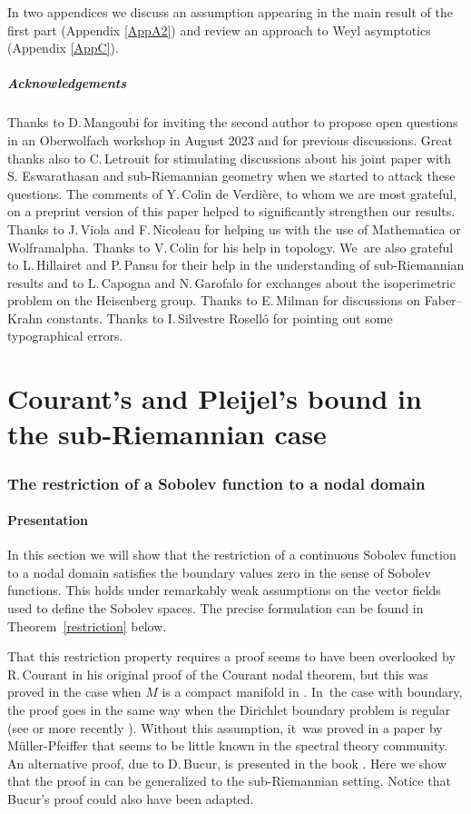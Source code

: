 \documentclass[10pt]{amsart}
\theoremstyle{definition}
\newcommand{\1}{\mathbbm{1}}
\begin{document}
In two appendices we discuss an assumption appearing in the main result of the first part (Appendix \ref{AppA2}) and review an approach to Weyl asymptotics (Appendix \ref{AppC}).

\subsubsection*{Acknowledgements}
Thanks to D.\,Mangoubi for inviting the second author to propose open questions in an Oberwolfach workshop in August 2023 and for previous discussions. Great thanks also to C.\,Letrouit for stimulating discussions about his joint paper with S. Eswarathasan and sub-Riemannian geometry when we started to attack these questions. The comments of Y.\,Colin de Verdière, to whom we are most grateful, on a preprint version \cite{FrHe1} of this paper helped to significantly strengthen our results. Thanks to J.\,Viola and F.\,Nicoleau for helping us with the use of Mathematica or Wolframalpha. Thanks to V.\,Colin for his help in topology. We~are also grateful to L.\,Hillairet and P.\,Pansu for their help in the understanding of sub-Riemannian results and to L.\,Capogna and N.\,Garofalo for exchanges about the isoperimetric problem on the Heisenberg group. Thanks to E.\,Milman for discussions on Faber--Krahn constants. Thanks to I.\,Silvestre Roselló for pointing out some typographical errors.

\part{Courant's and Pleijel's bound in the sub-Riemannian case}

\section{The restriction of a Sobolev function to a nodal domain}\label{srest}

\subsection{Presentation}
In this section we will show that the restriction of a continuous Sobolev function to a nodal domain satisfies the boundary values zero in the sense of Sobolev functions. This holds under remarkably weak assumptions on the vector fields used to define the Sobolev spaces. The precise formulation can be found in Theorem~\ref{restriction} below.

That this restriction property requires a proof seems to have been overlooked by R.\,Courant in his original proof of the Courant nodal theorem, but this was proved in the case when $M$ is a compact manifold in \cite{BerMe}. In~the case with boundary, the proof goes in the same way when the Dirichlet boundary problem is regular (see \cite{An} or more recently \cite{LMP}). Without this assumption, it~was proved in a paper by Müller-Pfeiffer \cite{MP} that seems to be little known in the spectral theory community. An alternative proof, due to D.\,Bucur, is presented in the book \cite{LMP}. Here we show that the proof in \cite{MP} can be generalized to the sub-Riemannian setting. Notice that Bucur's proof could also have been adapted.
\end{document}
